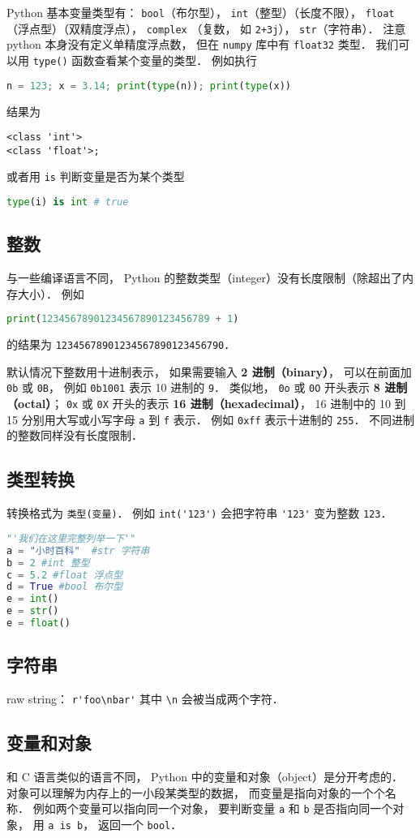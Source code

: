 
\begin{issues}
\issueDraft
\end{issues}


Python 基本变量类型有： \verb|bool|（布尔型）， \verb|int|（整型）（长度不限）， \verb|float|（浮点型）（双精度浮点）， \verb|complex| （复数， 如 \verb|2+3j|）， \verb|str|（字符串）． 注意 python 本身没有定义单精度浮点数， 但在 \verb|numpy| 库中有 \verb|float32| 类型． 我们可以用 \verb|type()| 函数查看某个变量的类型． 例如执行
\begin{lstlisting}[language=python]
n = 123; x = 3.14; print(type(n)); print(type(x))
\end{lstlisting}
结果为
\begin{lstlisting}
<class 'int'>
<class 'float'>;
\end{lstlisting}
或者用 \verb|is| 判断变量是否为某个类型
\begin{lstlisting}[language=python]
type(i) is int # true
\end{lstlisting}

\subsection{整数}
与一些编译语言不同， Python 的整数类型（integer）没有长度限制（除超出了内存大小）． 例如
\begin{lstlisting}[language=python]
print(12345678901234567890123456789 + 1)
\end{lstlisting}
的结果为 \verb|12345678901234567890123456790|．

默认情况下整数用十进制表示， 如果需要输入 \textbf{2 进制（binary）}， 可以在前面加 \verb|0b| 或 \verb|0B|， 例如 \verb|0b1001| 表示 10 进制的 \verb|9|． 类似地， \verb|0o| 或 \verb|0O| 开头表示 \textbf{8 进制（octal）}； \verb|0x| 或 \verb|0X| 开头的表示 \textbf{16 进制（hexadecimal）}， 16 进制中的 10 到 15 分别用大写或小写字母 \verb|a| 到 \verb|f| 表示． 例如 \verb|0xff| 表示十进制的 \verb|255|． 不同进制的整数同样没有长度限制．

\subsection{类型转换}
转换格式为 \verb|类型(变量)|． 例如 \verb|int('123')| 会把字符串 \verb|'123'| 变为整数 \verb|123|．
\begin{lstlisting}[language=python]
"'我们在这里完整列举一下'"
a = "小时百科"  #str 字符串
b = 2 #int 整型
c = 5.2 #float 浮点型
d = True #bool 布尔型
e = int()
e = str()
e = float()

\end{lstlisting}
\subsection{字符串}
raw string： \verb|r'foo\nbar'| 其中 \verb|\n| 会被当成两个字符．

\subsection{变量和对象}
和 C 语言类似的语言不同， Python 中的变量和对象（object）是分开考虑的． 对象可以理解为内存上的一小段某类型的数据， 而变量是指向对象的一个个名称． 例如两个变量可以指向同一个对象， 要判断变量 \verb|a| 和 \verb|b| 是否指向同一个对象， 用 \verb|a is b|， 返回一个 \verb|bool|．
